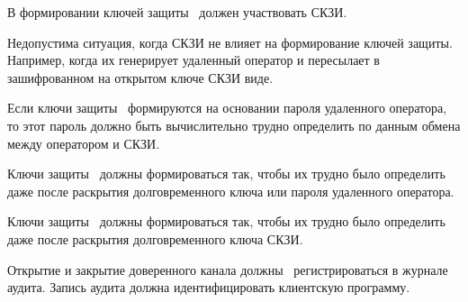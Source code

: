 \label{R.TC.Keys}
В формировании ключей защиты~ должен участвовать СКЗИ.

\begin{note}
Недопустима ситуация, когда СКЗИ не влияет на формирование ключей защиты.
Например, когда их генерирует удаленный оператор и пересылает 
в зашифрованном на открытом ключе СКЗИ виде.
\end{note}

\label{R.TC.Pwd}
Если ключи защиты~ формируются на основании пароля
удаленного оператора, то этот пароль должно быть вычислительно
трудно определить по данным обмена между оператором и СКЗИ.

\label{R.TC.FSWeak}
Ключи защиты~ должны формироваться так, чтобы их трудно
было определить даже после раскрытия долговременного ключа или пароля удаленного 
оператора.

\label{R.TC.FS}
Ключи защиты~ должны формироваться так, 
чтобы их трудно было определить даже после раскрытия долговременного ключа 
СКЗИ.

\label{R.TC.AU}
Открытие и закрытие доверенного канала должны~ 
регистрироваться в журнале аудита. Запись аудита должна идентифицировать 
клиентскую программу.



